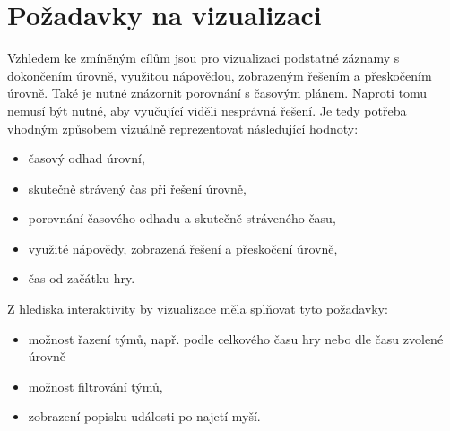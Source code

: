 \documentclass[
  digital, %
  oneside, %
  table,   %
  nolof,     %
  nolot,     %
]{fithesis3}
\begin{document}
\section{Požadavky na vizualizaci}
Vzhledem ke zmíněným cílům jsou pro vizualizaci podstatné záznamy s dokončením úrovně, využitou nápovědou, zobrazeným řešením a přeskočením úrovně. Také je nutné znázornit porovnání s časovým plánem. Naproti tomu nemusí být nutné, aby vyučující viděli nesprávná řešení. Je tedy potřeba vhodným způsobem vizuálně reprezentovat následující hodnoty:
\begin{itemize}
  \item časový odhad úrovní,
  \item skutečně strávený čas při řešení úrovně,
  \item porovnání časového odhadu a skutečně stráveného času,
  \item využité nápovědy, zobrazená řešení a přeskočení úrovně,
  \item čas od začátku hry.
\end{itemize}
Z hlediska interaktivity by vizualizace měla splňovat tyto požadavky:
\begin{itemize}
  \item možnost řazení týmů, např. podle celkového času hry nebo dle času zvolené úrovně
  \item možnost filtrování týmů,
  \item zobrazení popisku události po najetí myší.
\end{itemize}
\end{document}
